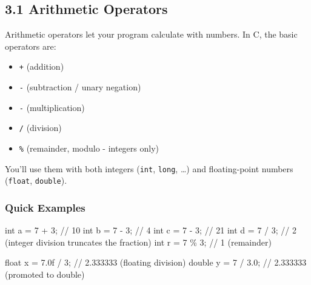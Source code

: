 \documentclass[
  letterpaper,
  DIV=11,
  numbers=noendperiod]{scrreprt}
\newenvironment{Shaded}{\begin{snugshade}}{\end{snugshade}}
\newcommand{\BuiltInTok}[1]{\textcolor[rgb]{0.00,0.23,0.31}{#1}}
\newcommand{\CommentTok}[1]{\textcolor[rgb]{0.37,0.37,0.37}{#1}}
\newcommand{\DataTypeTok}[1]{\textcolor[rgb]{0.68,0.00,0.00}{#1}}
\newcommand{\DecValTok}[1]{\textcolor[rgb]{0.68,0.00,0.00}{#1}}
\newcommand{\FloatTok}[1]{\textcolor[rgb]{0.68,0.00,0.00}{#1}}
\newcommand{\NormalTok}[1]{\textcolor[rgb]{0.00,0.23,0.31}{#1}}
\newcommand{\OperatorTok}[1]{\textcolor[rgb]{0.37,0.37,0.37}{#1}}
\providecommand{\tightlist}{%
  \setlength{\itemsep}{0pt}\setlength{\parskip}{0pt}}
\begin{document}
\subsection{3.1 Arithmetic Operators}\label{arithmetic-operators}

Arithmetic operators let your program calculate with numbers. In C, the
basic operators are:

\begin{itemize}
\tightlist
\item
  \texttt{+} (addition)
\item
  \texttt{-} (subtraction / unary negation)
\item
  \texttt{-} (multiplication)
\item
  \texttt{/} (division)
\item
  \texttt{\%} (remainder, modulo - integers only)
\end{itemize}

You'll use them with both integers (\texttt{int}, \texttt{long}, \ldots)
and floating-point numbers (\texttt{float}, \texttt{double}).

\subsubsection{Quick Examples}\label{quick-examples}

\begin{Shaded}
\begin{Highlighting}[]
\DataTypeTok{int}\NormalTok{ a }\OperatorTok{=} \DecValTok{7} \OperatorTok{+} \DecValTok{3}\OperatorTok{;}       \CommentTok{// 10}
\DataTypeTok{int}\NormalTok{ b }\OperatorTok{=} \DecValTok{7} \OperatorTok{{-}} \DecValTok{3}\OperatorTok{;}       \CommentTok{// 4}
\DataTypeTok{int}\NormalTok{ c }\OperatorTok{=} \DecValTok{7} \OperatorTok{{-}} \DecValTok{3}\OperatorTok{;}       \CommentTok{// 21}
\DataTypeTok{int}\NormalTok{ d }\OperatorTok{=} \DecValTok{7} \OperatorTok{/} \DecValTok{3}\OperatorTok{;}       \CommentTok{// 2  (integer division truncates the fraction)}
\DataTypeTok{int}\NormalTok{ r }\OperatorTok{=} \DecValTok{7} \OperatorTok{\%} \DecValTok{3}\OperatorTok{;}       \CommentTok{// 1  (remainder)}

\DataTypeTok{float}\NormalTok{ x }\OperatorTok{=} \FloatTok{7.0}\BuiltInTok{f} \OperatorTok{/} \DecValTok{3}\OperatorTok{;}  \CommentTok{// 2.333333 (floating division)}
\DataTypeTok{double}\NormalTok{ y }\OperatorTok{=} \DecValTok{7} \OperatorTok{/} \FloatTok{3.0}\OperatorTok{;}  \CommentTok{// 2.333333 (promoted to double)}
\end{Highlighting}
\end{Shaded}
\end{document}
